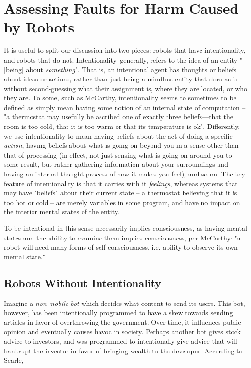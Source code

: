 \documentclass[12]{article}
\begin{document}
\section{Assessing Faults for Harm Caused by Robots}
	It is useful to split our discussion into two pieces: robots that have intentionality, and robots that do not. Intentionality, generally, refers to the idea of an entity "[being] about \textit{something}"\cite{intentionality}. That is, an intentional agent has thoughts or beliefs about ideas or actions, rather than just being a mindless entity that does as is without second-guessing what their assignment is, where they are located, or who they are. To some, such as McCarthy, intentionality seems to sometimes to be defined as simply mean having some notion of an internal state of computation -- "a thermostat may usefully be ascribed one of exactly three beliefs—that the room is too cold, that it is too warm or that its temperature is ok"\cite{mccarthy}. Differently, we use intentionality to mean having beliefs about the act of doing a specific \textit{action}, having beliefs about what is going on beyond you in a sense other than that of processing (in effect, not just sensing what is going on around you to some result, but rather gathering information about your surroundings and having an internal thought process of how it makes you feel), and so on. The key feature of intentionality is that it carries with it \textit{feelings}, whereas systems that may have "beliefs" about their current state -- a thermostat believing that it is too hot or cold -- are merely variables in some program, and have no impact on the interior mental states of the entity. 
	
	 To be intentional in this sense necessarily implies consciousness, as having mental states and the ability to examine them implies consciousness, per McCarthy: "a robot will need many forms of self-consciousness, i.e. ability to observe its own mental state."\cite{mccarthy}  

	\subsection{Robots Without Intentionality}
		Imagine a \textit{non mobile bot} which decides what content to send its users. This bot, however, has been intentionally programmed to have a skew towards sending articles in favor of overthrowing the government. Over time, it influences public opinion and eventually causes havoc in society. Perhaps another bot gives stock advice to investors, and was programmed to intentionally give advice that will bankrupt the investor in favor of bringing wealth to the developer. According to Searle\cite{chineseroom1, chineseroom2},
	
\end{document}
